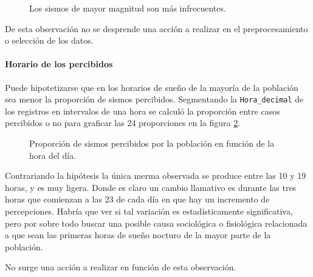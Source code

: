 \documentclass[a4paper]{report}
\begin{document}

\begin{figure}[!h]
\centering

\caption{Los sismos de mayor magnitud son más infrecuentes.}
\label{fig:acumulado_anual_magnitud}
\end{figure}

De esta observación no se desprende una acción a realizar en el preprocesamiento o selección de los datos.


\paragraph{Horario de los percibidos}
Puede hipotetizarse que en los horarios de sueño de la mayoría de la población sea menor la proporción de sismos percibidos.
Segmentando la \verb'Hora_decimal' de los registros en intervalos de una hora se calculó la proporción entre casos percibidos o no para graficar las 24 proporciones en la figura \ref{fig:histograma_percibidos_por_hora}. 
\begin{figure}[!h]
\centering

\caption{Proporción de sismos percibidos por la población en función de la hora del día.}
\label{fig:histograma_percibidos_por_hora}
\end{figure}

Contrariando la hipótesis la única merma observada se produce entre las 10 y 19 horas, y es muy ligera.
Donde es claro un cambio llamativo es durante las tres horas que comienzan a las 23 de cada día en que hay un incremento de percepciones. 
Habría que ver si tal variación es estadísticamente significativa, pero por sobre todo buscar una posible causa sociológica o fisiológica relacionada a que sean las primeras horas de sueño nocturo de la mayor parte de la población.

No surge una acción a realizar en función de esta observación.
\end{document}
